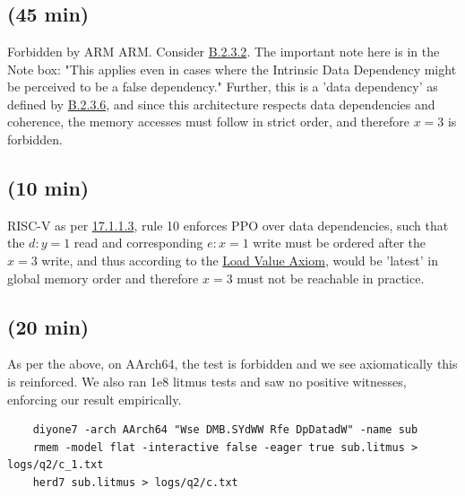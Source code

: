 \section{}
\subsection{(45 min)}
Forbidden by ARM ARM. 
Consider \href{https://developer.arm.com/documentation/ddi0487/maa/-Part-B-The-AArch64-Application-Level-Architecture/-Chapter-B2-The-AArch64-Application-Level-Memory-Model/-B2-3-Ordering-requirements-defined-by-the-formal-concurrency-model/-B2-3-2-Intrinsic-Dependency-relations?lang=en}{B.2.3.2}. 
The important note here is in the Note box: 
"This applies even in cases where the Intrinsic Data Dependency might be perceived to be a false dependency." 
Further, this is a 'data dependency' as defined by \href{https://developer.arm.com/documentation/ddi0487/maa/-Part-B-The-AArch64-Application-Level-Architecture/-Chapter-B2-The-AArch64-Application-Level-Memory-Model/-B2-3-Ordering-requirements-defined-by-the-formal-concurrency-model/-B2-3-6-Dependency-relations?lang=en}{B.2.3.6},  
and since this architecture respects data dependencies and coherence, the memory accesses must follow in strict order, and therefore $x=3$ is forbidden. 

\subsection{(10 min)}
RISC-V as per \href{https://docs.riscv.org/reference/isa/unpriv/rvwmo.html#17-1-1-3-preserved-program-order}{17.1.1.3}, rule 10 enforces PPO over data dependencies, 
such that the $d:y=1$ read and corresponding $e:x=1$ write must be ordered after the $x=3$ write, and thus according to the 
\href{https://docs.riscv.org/reference/isa/unpriv/mm-eplan.html#preserved-program-order-and-global-memory-order}{Load Value Axiom}, 
would be 'latest' in global memory order and therefore $x=3$ must not be reachable in practice.


\subsection{(20 min)}

As per the above, on AArch64, the test is forbidden and we see axiomatically this is reinforced. 
We also ran 1e8 litmus tests and saw no positive witnesses, enforcing our result empirically. 

\begin{lstlisting}
    diyone7 -arch AArch64 "Wse DMB.SYdWW Rfe DpDatadW" -name sub
    rmem -model flat -interactive false -eager true sub.litmus > logs/q2/c_1.txt
    herd7 sub.litmus > logs/q2/c.txt
\end{lstlisting}

